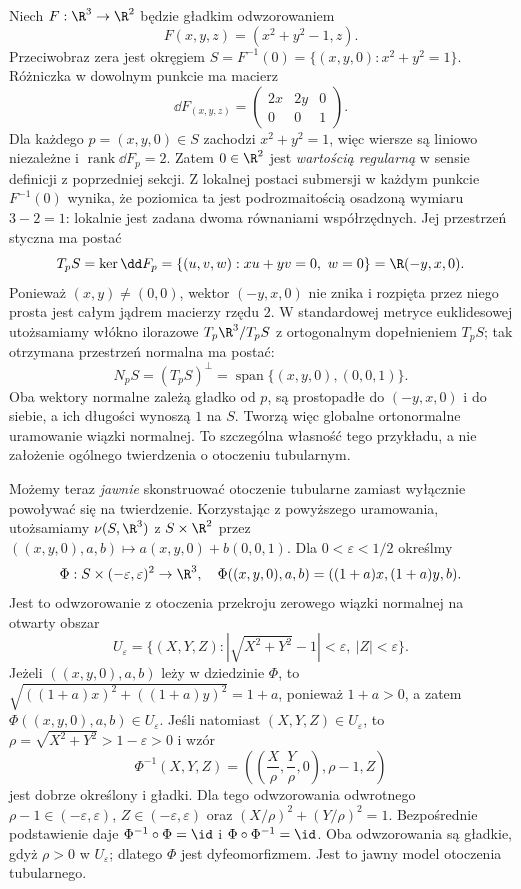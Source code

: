 \begin{przyklad}
\label{prz:at30-okrag-regularny}
Niech $F:\R^3\to\R^2$ będzie gładkim odwzorowaniem
\[
 F(x,y,z)=(x^2+y^2-1,z).
\]
Przeciwobraz zera jest okręgiem
$S=F^{-1}(0)=\{(x,y,0):x^2+y^2=1\}$.
Różniczka w dowolnym punkcie ma macierz
\[
 \dd F_{(x,y,z)}=
 \begin{pmatrix}2x&2y&0\\0&0&1\end{pmatrix}.
\]
Dla każdego $p=(x,y,0)\in S$ zachodzi $x^2+y^2=1$,
więc wiersze są liniowo niezależne i
$\operatorname{rank}\dd F_p=2$.
Zatem $0\in\R^2$ jest \emph{wartością regularną}
w sensie definicji z poprzedniej sekcji.
Z lokalnej postaci submersji w każdym punkcie
$F^{-1}(0)$ wynika, że poziomica ta jest
podrozmaitością osadzoną wymiaru $3-2=1$:
lokalnie jest zadana dwoma równaniami
współrzędnych.
Jej przestrzeń styczna ma postać
\[
 T_pS=\ker\dd F_p
 =\{(u,v,w):xu+yv=0,\ w=0\}
 =\R(-y,x,0).
\]
Ponieważ $(x,y)\ne(0,0)$, wektor
$(-y,x,0)$ nie znika i rozpięta przez niego
prosta jest całym jądrem macierzy rzędu $2$.
W standardowej metryce euklidesowej
utożsamiamy włókno ilorazowe
$T_p\R^3/T_pS$ z ortogonalnym dopełnieniem
$T_pS$; tak otrzymana przestrzeń normalna ma postać:
\[
 N_pS=(T_pS)^\perp
 =\operatorname{span}\{(x,y,0),(0,0,1)\}.
\]
Oba wektory normalne zależą gładko od $p$,
są prostopadłe do $(-y,x,0)$ i do siebie,
a ich długości wynoszą $1$ na $S$.
Tworzą więc globalne ortonormalne
uramowanie wiązki normalnej.
To szczególna własność tego przykładu,
a nie założenie ogólnego twierdzenia
o otoczeniu tubularnym.

Możemy teraz \emph{jawnie} skonstruować otoczenie
tubularne zamiast wyłącznie powoływać się na twierdzenie.
Korzystając z powyższego uramowania, utożsamiamy
$\nu(S,\R^3)$ z $S\times\R^2$ przez
$((x,y,0),a,b)\mapsto a(x,y,0)+b(0,0,1)$.
Dla $0<\varepsilon<1/2$ określmy
\[
 \Phi:S\times(-\varepsilon,\varepsilon)^2\to\R^3,
 \quad
 \Phi((x,y,0),a,b)=((1+a)x,(1+a)y,b).
\]
Jest to odwzorowanie z otoczenia przekroju zerowego
wiązki normalnej na otwarty obszar
\[
 U_\varepsilon=
 \{(X,Y,Z):|\sqrt{X^2+Y^2}-1|<\varepsilon,\
 |Z|<\varepsilon\}.
\]
Jeżeli $((x,y,0),a,b)$ leży w dziedzinie
$\Phi$, to $\sqrt{((1+a)x)^2+((1+a)y)^2}
=1+a$, ponieważ $1+a>0$, a zatem
$\Phi((x,y,0),a,b)\in U_\varepsilon$.
Jeśli natomiast $(X,Y,Z)\in U_\varepsilon$, to
$\rho=\sqrt{X^2+Y^2}>1-\varepsilon>0$
i wzór
\[
 \Phi^{-1}(X,Y,Z)=
 \left(\left(\frac X\rho,\frac Y\rho,0\right),
 \rho-1,Z\right)
\]
jest dobrze określony i gładki.
Dla tego odwzorowania odwrotnego
$\rho-1\in(-\varepsilon,\varepsilon)$,
$Z\in(-\varepsilon,\varepsilon)$
oraz $(X/\rho)^2+(Y/\rho)^2=1$.
Bezpośrednie podstawienie daje
$\Phi^{-1}\circ\Phi=\id$ i
$\Phi\circ\Phi^{-1}=\id$.
Oba odwzorowania są gładkie, gdyż
$\rho>0$ w $U_\varepsilon$;
dlatego $\Phi$ jest dyfeomorfizmem.
Jest to jawny model otoczenia tubularnego.
\end{przyklad}

